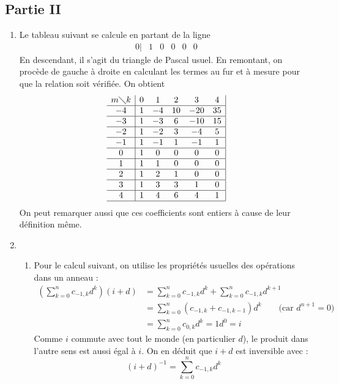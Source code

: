 \subsection*{Partie II}
\begin{enumerate}
 \item Le tableau suivant se calcule en partant de la ligne 
\begin{displaymath}
 \begin{matrix}
  0 | & 1 & 0 &  0 & 0 & 0
\end{matrix}
\end{displaymath}
En descendant, il s'agit du triangle de Pascal usuel. En remontant, on procède de gauche à droite en calculant les termes au fur et à mesure pour que la relation soit vérifiée. On obtient
\begin{displaymath}
 \begin{array}{c|ccccc|}
m\diagdown k   & 0 & 1  & 2  & 3   & 4  \\ \hline
-4 & 1 & -4 & 10 & -20 & 35 \\ \hline
-3 & 1 & -3 & 6  & -10 & 15 \\ \hline
-2 & 1 & -2 & 3  & -4  &  5 \\ \hline
-1 & 1 & -1 & 1  & -1  & 1  \\ \hline
0  & 1 & 0  & 0  &  0  & 0  \\ \hline 
1  & 1 & 1  & 0  &  0  & 0  \\ \hline
2  & 1 & 2  & 1  &  0  & 0  \\ \hline
3  & 1 & 3  & 3  &  1  & 0  \\ \hline
4  & 1 & 4  & 6  &  4  & 1  \\ \hline
\end{array}
\end{displaymath}
On peut remarquer aussi que ces coefficients sont entiers à cause de leur définition même.
\item \begin{enumerate}
 \item Pour le calcul suivant, on utilise les propriétés usuelles des opérations dans un anneau :
\begin{align*}
 \left( \sum _{k=0}^{n}c_{-1,k}d^k \right) (i+d)
&= \sum _{k=0}^{n}c_{-1,k}d^k + \sum _{k=0}^{n}c_{-1,k}d^{k+1} \\
&= \sum _{k=0}^{n}\left( c_{-1,k}+c_{-1,k-1}\right) d^k \hspace{20pt} \text{ (car $d^{n+1}=0$)} \\
&= \sum _{k=0}^{n}c_{0,k}d^k = 1 d^0 = i
\end{align*}
Comme $i$ commute avec tout le monde (en particulier $d$), le produit dans l'autre sens est aussi égal à $i$. On en déduit que $i+d$ est inversible avec :
\begin{displaymath}
 (i+d)^{-1}= \sum _{k=0}^{n}c_{-1,k}d^k
\end{displaymath}


\end{enumerate}
\end{enumerate}
